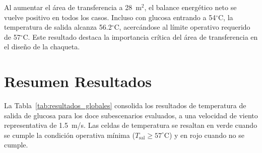 \documentclass[12pt,a4paper]{elsarticle}
\begin{document}
Al aumentar el \'{a}rea de transferencia a 28~m$^2$, el balance energ\'{e}tico neto se vuelve positivo en todos los casos. Incluso con glucosa entrando a 54$^\circ$C, la temperatura de salida alcanza 56.2$^\circ$C, acerc\'{a}ndose al l\'{i}mite operativo requerido de 57$^\circ$C. Este resultado destaca la importancia cr\'{i}tica del \'{a}rea de transferencia en el dise\~{n}o de la chaqueta.


\section{Resumen Resultados}

La Tabla~\ref{tab:resultados_globales} consolida los resultados de temperatura de salida de glucosa para los doce subescenarios evaluados, a una velocidad de viento representativa de 1.5~m/s. Las celdas de temperatura se resaltan en \colorbox{green!25}{verde} cuando se cumple la condici\'{o}n operativa m\'{i}nima ($T_{\text{sal}} \geq 57^\circ$C) y en \colorbox{red!20}{rojo} cuando no se cumple. 
\end{document}
